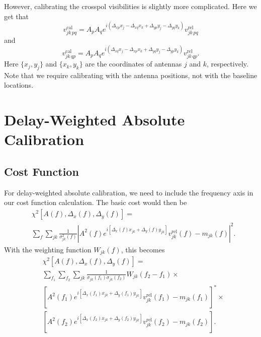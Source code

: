 \documentclass{article}
\begin{document}
However, calibrating the crosspol visibilities is slightly more complicated. Here we get that
\begin{equation}
    v_{jk \, pq}^\text{cal} = A_p A_q e^{i(\Delta_{xp} x_j - \Delta_{xq} x_k + \Delta_{yp} y_j - \Delta_{yq} y_k)} v^\text{rel}_{jk \, pq}
\end{equation}
and
\begin{equation}
    v_{jk \, qp}^\text{cal} = A_p A_q e^{i(\Delta_{xq} x_j - \Delta_{xp} x_k + \Delta_{yq} y_j - \Delta_{yp} y_k)} v^\text{rel}_{jk \, qp}.
\end{equation}
Here $\{x_j, y_j\}$ and $\{x_k, y_k\}$ are the coordinates of antennas $j$ and $k$, respectively. Note that we require calibrating with the antenna positions, not with the baseline locations.


\section{Delay-Weighted Absolute Calibration}

\subsection{Cost Function}

For delay-weighted absolute calibration, we need to include the frequency axis in our cost function calculation. The basic cost would then be
\begin{equation}
\begin{split}
    &\chi^2[A(f), \Delta_x(f), \Delta_y(f)] = \\
    &\sum_f \sum_{jk} \frac{1}{\sigma_{jk}^2(f)} \left| A^2(f) e^{i[\Delta_x(f) x_{jk} + \Delta_y(f) y_{jk}]} v^\text{rel}_{jk}(f) - m_{jk}(f) \right|^2.
\end{split}
\end{equation}
With the weighting function $W_{jk}(f)$, this becomes
\begin{equation}
\begin{split}
    &\chi^2[A(f), \Delta_x(f), \Delta_y(f)] = \\
    &\sum_{f_1} \sum_{f_2} \sum_{jk} \frac{1}{\sigma_{jk}(f_1)\sigma_{jk}(f_2)} W_{jk}(f_2-f_1) \times \\
    & \left[ A^2(f_1) e^{i[\Delta_x(f_1) x_{jk} + \Delta_y(f_1) y_{jk}]} v^\text{rel}_{jk}(f_1) - m_{jk}(f_1) \right]^* \times \\
    & \left[ A^2(f_2) e^{i[\Delta_x(f_2) x_{jk} + \Delta_y(f_2) y_{jk}]} v^\text{rel}_{jk}(f_2) - m_{jk}(f_2) \right].
\end{split}
\end{equation}
\end{document}
